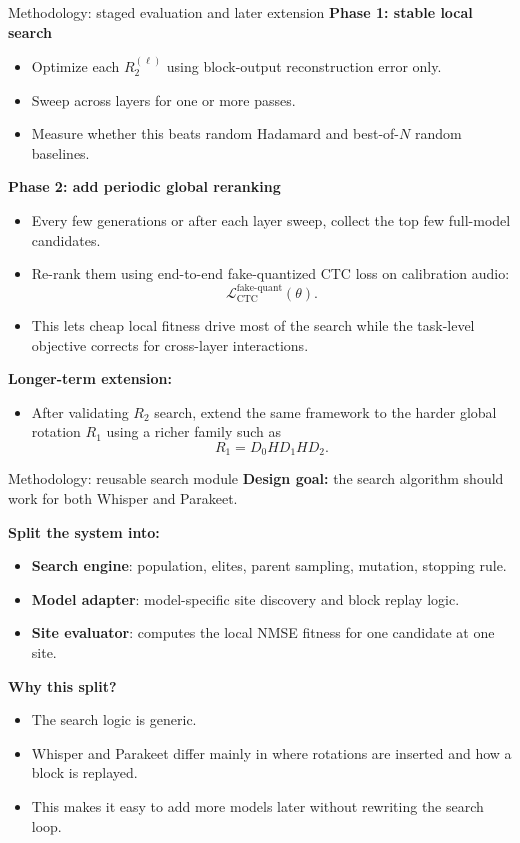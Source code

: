 \documentclass[aspectratio=169,11pt]{beamer}
\begin{document}
\begin{frame}{Methodology: staged evaluation and later extension}
\textbf{Phase 1: stable local search}
\begin{itemize}
  \item Optimize each $R_2^{(\ell)}$ using block-output reconstruction error only.
  \item Sweep across layers for one or more passes.
  \item Measure whether this beats random Hadamard and best-of-$N$ random baselines.
\end{itemize}

\vspace{0.2cm}
\textbf{Phase 2: add periodic global reranking}
\begin{itemize}
  \item Every few generations or after each layer sweep, collect the top few full-model candidates.
  \item Re-rank them using end-to-end fake-quantized CTC loss on calibration audio:
  \[
  \mathcal L_{\mathrm{CTC}}^{\mathrm{fake\text{-}quant}}(\theta).
  \]
  \item This lets cheap local fitness drive most of the search while the task-level objective corrects for cross-layer interactions.
\end{itemize}

\vspace{0.2cm}
\textbf{Longer-term extension:}
\begin{itemize}
  \item After validating $R_2$ search, extend the same framework to the harder global rotation $R_1$ using a richer family such as
  \[
  R_1 = D_0 H D_1 H D_2.
  \]
\end{itemize}
\end{frame}

\begin{frame}{Methodology: reusable search module}
\textbf{Design goal:} the search algorithm should work for both Whisper and Parakeet.

\vspace{0.2cm}
\textbf{Split the system into:}
\begin{itemize}
  \item \textbf{Search engine}: population, elites, parent sampling, mutation, stopping rule.
  \item \textbf{Model adapter}: model-specific site discovery and block replay logic.
  \item \textbf{Site evaluator}: computes the local NMSE fitness for one candidate at one site.
\end{itemize}

\vspace{0.2cm}
\textbf{Why this split?}
\begin{itemize}
  \item The search logic is generic.
  \item Whisper and Parakeet differ mainly in where rotations are inserted and how a block is replayed.
  \item This makes it easy to add more models later without rewriting the search loop.
\end{itemize}
\end{frame}
\end{document}
